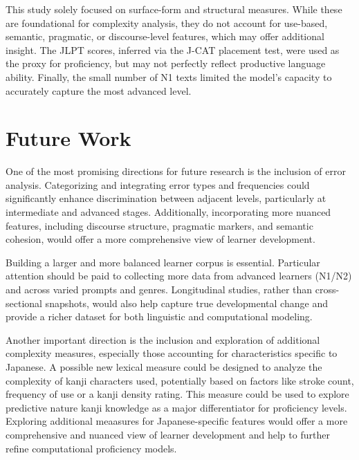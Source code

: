 This study solely focused on surface-form and structural measures. While these are foundational for complexity
analysis, they do not account for use-based, semantic, pragmatic, or discourse-level features, which may offer
additional insight. The JLPT scores, inferred via the J-CAT placement test, were used as the proxy for proficiency,
but may not perfectly reflect productive language ability. Finally, the small number of N1 texts limited the model's
capacity to accurately capture the most advanced level.

\section{Future Work}
%
%
%
%

One of the most promising directions for future research is the inclusion of error analysis. Categorizing and
integrating error types and frequencies could significantly enhance discrimination between adjacent levels,
particularly at intermediate and advanced stages. Additionally, incorporating more nuanced features, including
discourse structure, pragmatic markers, and semantic cohesion, would offer a more comprehensive view of learner
development.

Building a larger and more balanced learner corpus is essential. Particular attention should be paid to collecting
more data from advanced learners (N1/N2) and across varied prompts and genres. Longitudinal studies, rather than
cross-sectional snapshots, would also help capture true developmental change and provide a richer dataset for both
linguistic and computational modeling.

Another important direction is the inclusion and exploration of additional complexity measures, especially those
accounting for characteristics specific to Japanese. A possible new lexical measure could be designed to analyze the
complexity of kanji characters used, potentially based on factors like stroke count, frequency of use or a kanji
density rating. This measure could be used to explore predictive nature kanji knowledge as a major
differentiator for proficiency levels. Exploring additional meaasures for Japanese-specific features would offer a
more comprehensive and nuanced view of learner development and help to further refine computational proficiency models.

